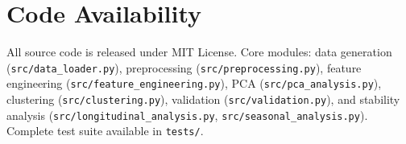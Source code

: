 \documentclass[11pt,a4paper]{article}
\begin{document}
\section*{Code Availability}
All source code is released under MIT License. Core modules: data generation (\texttt{src/data\_loader.py}), preprocessing (\texttt{src/preprocessing.py}), feature engineering (\texttt{src/feature\_engineering.py}), PCA (\texttt{src/pca\_analysis.py}), clustering (\texttt{src/clustering.py}), validation (\texttt{src/validation.py}), and stability analysis (\texttt{src/longitudinal\_analysis.py}, \texttt{src/seasonal\_analysis.py}). Complete test suite available in \texttt{tests/}.

\printbibliography
\end{document}
